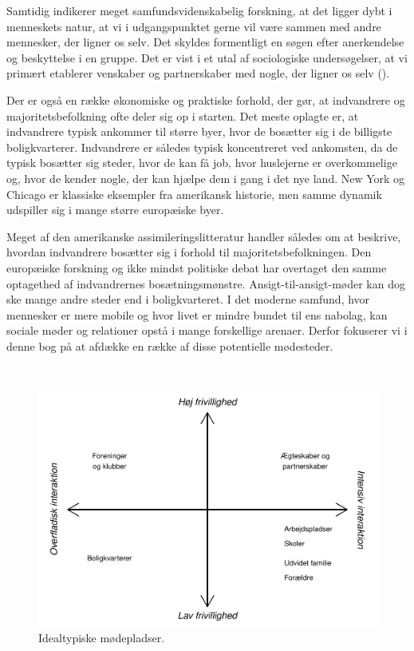\documentclass[
]{book}
\begin{document}
Samtidig indikerer meget samfundsvidenskabelig forskning, at det ligger dybt i menneskets natur, at vi i udgangspunktet gerne vil være sammen med andre mennesker, der ligner os selv. Det skyldes formentligt en søgen efter anerkendelse og beskyttelse i en gruppe. Det er vist i et utal af sociologiske undersøgelser, at vi primært etablerer venskaber og partnerskaber med nogle, der ligner os selv ().

Der er også en række økonomiske og praktiske forhold, der gør, at indvandrere og majoritetsbefolkning ofte deler sig op i starten. Det meste oplagte er, at indvandrere typisk ankommer til større byer, hvor de bosætter sig i de billigste boligkvarterer. Indvandrere er således typisk koncentreret ved ankomsten, da de typisk bosætter sig steder, hvor de kan få job, hvor huslejerne er overkommelige og, hvor de kender nogle, der kan hjælpe dem i gang i det nye land. New York og Chicago er klassiske eksempler fra amerikansk historie, men samme dynamik udspiller sig i mange større europæiske byer.

Meget af den amerikanske assimileringslitteratur handler således om at beskrive, hvordan indvandrere bosætter sig i forhold til majoritetsbefolkningen. Den europæiske forskning og ikke mindst politiske debat har overtaget den samme optagethed af indvandrernes bosætningsmønstre. Ansigt-til-ansigt-møder kan dog ske mange andre steder end i boligkvarteret. I det moderne samfund, hvor mennesker er mere mobile og hvor livet er mindre bundet til ens nabolag, kan sociale møder og relationer opstå i mange forskellige arenaer. Derfor fokuserer vi i denne bog på at afdække en række af disse potentielle mødesteder.

\newpage

~~

\begin{figure}
\includegraphics[width=1\linewidth]{en-befolkning-blander-sig_files/figure-latex/fig-1-1-1} \caption{Idealtypiske mødepladser.}\label{fig:fig-1-1}
\end{figure}
\end{document}
